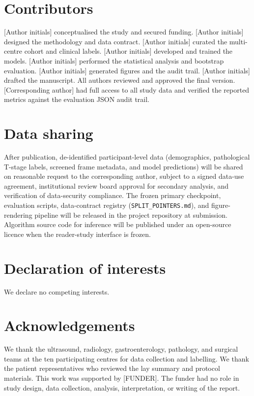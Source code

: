 \documentclass[11pt,a4paper]{article}
\begin{document}
\section*{Contributors}
[Author initials] conceptualised the study and secured funding. [Author initials] designed the methodology and data contract. [Author initials] curated the multi-centre cohort and clinical labels. [Author initials] developed and trained the models. [Author initials] performed the statistical analysis and bootstrap evaluation. [Author initials] generated figures and the audit trail. [Author initials] drafted the manuscript. All authors reviewed and approved the final version. [Corresponding author] had full access to all study data and verified the reported metrics against the evaluation JSON audit trail.

\section*{Data sharing}
After publication, de-identified participant-level data (demographics, pathological T-stage labels, screened frame metadata, and model predictions) will be shared on reasonable request to the corresponding author, subject to a signed data-use agreement, institutional review board approval for secondary analysis, and verification of data-security compliance. The frozen primary checkpoint, evaluation scripts, data-contract registry (\texttt{SPLIT\_POINTERS.md}), and figure-rendering pipeline will be released in the project repository at submission. Algorithm source code for inference will be published under an open-source licence when the reader-study interface is frozen.

\section*{Declaration of interests}
We declare no competing interests.

\section*{Acknowledgements}
We thank the ultrasound, radiology, gastroenterology, pathology, and surgical teams at the ten participating centres for data collection and labelling. We thank the patient representatives who reviewed the lay summary and protocol materials. This work was supported by [FUNDER]. The funder had no role in study design, data collection, analysis, interpretation, or writing of the report.
\end{document}
